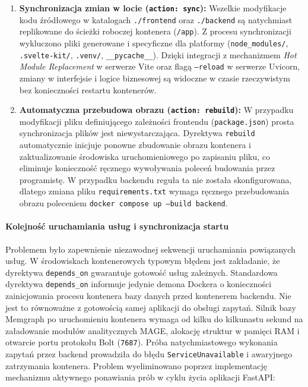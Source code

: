 \documentclass[twoside]{projektInzynierskiMS1z}
\begin{document}
\begin{enumerate} 
    \item \textbf{Synchronizacja zmian w locie (\texttt{action: sync}):} Wszelkie modyfikacje kodu źródłowego w katalogach \texttt{./frontend} oraz \texttt{./backend} są natychmiast replikowane do ścieżki roboczej kontenera (\texttt{/app}). Z procesu synchronizacji wykluczono pliki generowane i specyficzne dla platformy (\texttt{node\_modules/}, \texttt{.svelte-kit/}, \texttt{.venv/}, \texttt{\_\_pycache\_\_}). Dzięki integracji z mechanizmem \textit{Hot Module Replacement} w serwerze Vite oraz flagą \texttt{--reload} w serwerze Uvicorn, zmiany w interfejsie i logice biznesowej są widoczne w czasie rzeczywistym bez konieczności restartu kontenerów. 
    \item \textbf{Automatyczna przebudowa obrazu (\texttt{action: rebuild}):}
    W przypadku modyfikacji pliku definiującego zależności frontendu
    (\texttt{package.json}) prosta synchronizacja plików jest niewystarczająca.
    Dyrektywa \texttt{rebuild} automatycznie inicjuje ponowne zbudowanie obrazu
    kontenera i zaktualizowanie środowiska uruchomieniowego po zapisaniu pliku,
    co eliminuje konieczność ręcznego wywoływania poleceń budowania przez
    programistę. W przypadku backendu reguła ta nie została skonfigurowana,
    dlatego zmiana pliku \texttt{requirements.txt} wymaga ręcznego przebudowania
    obrazu poleceniem \texttt{docker compose up --build backend}.                    
\end{enumerate}                       

\paragraph{Kolejność uruchamiania usług i synchronizacja startu}
Problemem było zapewnienie niezawodnej sekwencji uruchamiania powiązanych usług. W środowiskach kontenerowych typowym błędem jest zakładanie, że dyrektywa \texttt{depends\_on} gwarantuje gotowość usług zależnych. Standardowa dyrektywa \texttt{depends\_on} informuje jedynie demona Dockera o konieczności zainicjowania procesu kontenera bazy danych przed kontenerem backendu. Nie jest to równoważne z gotowością samej aplikacji do obsługi zapytań. Silnik bazy Memgraph po uruchomieniu kontenera wymaga od kilku do kilkunastu sekund na załadowanie modułów analitycznych MAGE, alokację struktur w pamięci RAM i otwarcie portu protokołu Bolt (\texttt{7687}). Próba natychmiastowego wykonania zapytań przez backend prowadziła do błędu \texttt{ServiceUnavailable} i awaryjnego zatrzymania kontenera. Problem wyeliminowano poprzez implementację mechanizmu aktywnego ponawiania prób w cyklu życia aplikacji FastAPI:
\end{document}
